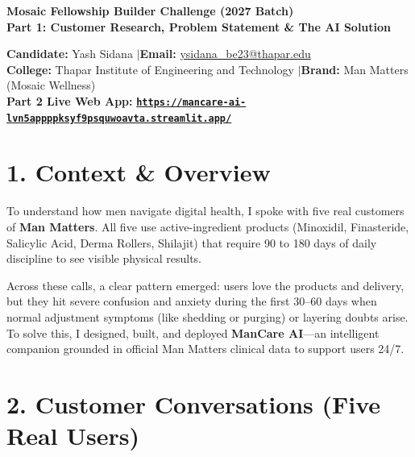 \documentclass[11pt,a4paper]{article}
\begin{document}
\begin{center}
    {\LARGE \textbf{\color{brandteal}Mosaic Fellowship Builder Challenge (2027 Batch)}}\\[4pt]
    {\large \textbf{\color{branddark}Part 1: Customer Research, Problem Statement \& The AI Solution}}
\end{center}
\vspace{4pt}

\begin{tcolorbox}[colback=boxbg, colframe=brandteal, arc=2mm, boxrule=0.8pt, left=10pt, right=10pt, top=7pt, bottom=7pt]
\centering\small
\textbf{Candidate:} Yash Sidana \quad$\vert$\quad \textbf{Email:} \href{mailto:ysidana_be23@thapar.edu}{ysidana\_be23@thapar.edu}\\[3pt]
\textbf{College:} Thapar Institute of Engineering and Technology \quad$\vert$\quad \textbf{Brand:} Man Matters (Mosaic Wellness)\\[4pt]
\textbf{Part 2 Live Web App:} \href{https://mancare-ai-lvn5appppksyf9psquwoavta.streamlit.app/}{\texttt{\textbf{https://mancare-ai-lvn5appppksyf9psquwoavta.streamlit.app/}}}
\end{tcolorbox}
\vspace{6pt}

\section*{1. Context \& Overview}
To understand how men navigate digital health, I spoke with five real customers of \textbf{Man Matters}. All five use active-ingredient products (Minoxidil, Finasteride, Salicylic Acid, Derma Rollers, Shilajit) that require 90 to 180 days of daily discipline to see visible physical results.

Across these calls, a clear pattern emerged: users love the products and delivery, but they hit severe confusion and anxiety during the first 30--60 days when normal adjustment symptoms (like shedding or purging) or layering doubts arise. To solve this, I designed, built, and deployed \textbf{ManCare AI}---an intelligent companion grounded in official Man Matters clinical data to support users 24/7.

\section*{2. Customer Conversations (Five Real Users)}
\end{document}
